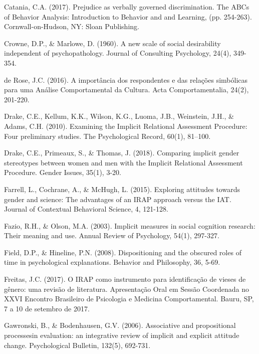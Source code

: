 \hangindent=25pt
\noindent Catania, C.A. (2017). Prejudice as verbally governed discrimination. The ABCs of Behavior Analysis: Introduction to Behavior and and Learning, (pp. 254-263). Cornwall-on-Hudson, NY: Sloan Publi\-shing. 

\hangindent=25pt
\noindent Crowne, D.P., \& Marlowe, D. (1960). A new scale of social desirability independent of psychopathology. Journal of Consulting Psychology, 24(4), 349-354.

\hangindent=25pt
\noindent de Rose, J.C. (2016). A importância dos respondentes e das relações simbólicas para uma Análise Comportamental da Cultura. Acta Comportamentalia, 24(2), 201-220.

\hangindent=25pt
\noindent Drake, C.E., Kellum, K.K., Wilson, K.G., Luoma, J.B., Weinstein, J.H., \& Adams, C.H. (2010). Examining the Implicit Relational Assessment Procedure: Four preliminary studies. The Psychological Record, 60(1), 81–100.

\hangindent=25pt
\noindent Drake, C.E., Primeaux, S., \& Thomas, J. (2018). Comparing implicit gender stereotypes between women and men with the Implicit Relational Assessment Procedure. Gender Issues, 35(1), 3-20.

\hangindent=25pt
\noindent Farrell, L., Cochrane, A., \& McHugh, L. (2015). Exploring attitudes towards gender and science: The advantages of an IRAP approach versus the IAT. Journal of Contextual Behavioral Science, 4, 121-128.

\hangindent=25pt
\noindent Fazio, R.H., \& Olson, M.A. (2003). Implicit measures in social cognition research: Their meaning and use. Annual Review of Psychology, 54(1), 297-327.

\hangindent=25pt
\noindent Field, D.P., \& Hineline, P.N. (2008). Dispositioning and the obscured roles of time in psychological explanations. Behavior and Philosophy, 36, 5-69.

\hangindent=25pt
\noindent Freitas, J.C. (2017). O IRAP como instrumento para identificação de vieses de gênero: uma revisão de literatura. Apresentação Oral em Sessão Coordenada no XXVI Encontro Brasileiro de Psicologia e Medicina Comportamental. Bauru, SP, 7 a 10 de setembro de 2017.

\hangindent=25pt
\noindent Gawronski, B., \& Bodenhausen, G.V. (2006). Associative and propositional processesin evaluation: an integrative review of implicit and explicit attitude change. Psychological Bulletin, 132(5), 692-731.

